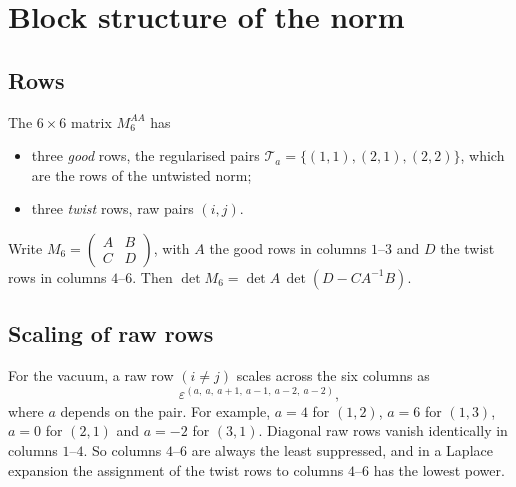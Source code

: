 \documentclass[11pt]{article}
\begin{document}
\section{Block structure of the norm}

\subsection{Rows}
The $6\times6$ matrix $M_6^{AA}$ has
\begin{itemize}
\item three \emph{good} rows, the regularised pairs
$\mathcal T_a=\{(1,1),(2,1),(2,2)\}$, which are the rows of the untwisted norm;
\item three \emph{twist} rows, raw pairs $(i,j)$.
\end{itemize}
Write $M_6=\begin{pmatrix}A&B\\C&D\end{pmatrix}$, with $A$ the good rows in columns $1$--$3$ and
$D$ the twist rows in columns $4$--$6$. Then
$\det M_6=\det A\,\det(D-CA^{-1}B)$.

\subsection{Scaling of raw rows}
For the vacuum, a raw row $(i\neq j)$ scales across the six columns as
\begin{equation}
\varepsilon^{(a,\ a,\ a+1,\ a-1,\ a-2,\ a-2)},
\end{equation}
where $a$ depends on the pair. For example, $a=4$ for $(1,2)$, $a=6$ for $(1,3)$, $a=0$ for $(2,1)$
and $a=-2$ for $(3,1)$. Diagonal raw rows vanish identically in columns $1$--$4$. So columns $4$--$6$
are always the least suppressed, and in a Laplace expansion the assignment of the twist rows to
columns $4$--$6$ has the lowest power.
\end{document}
